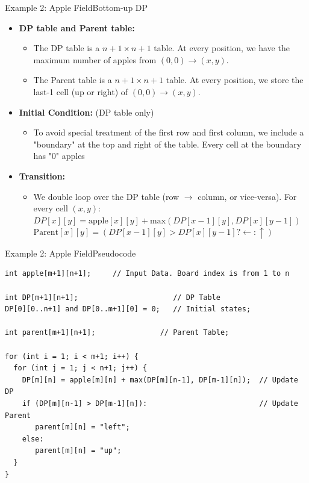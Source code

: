\begin{frame}{Example 2: Apple Field}{Bottom-up DP}
  \begin{itemize}
  \item {\bf DP table and Parent table:}
  \begin{itemize}
    \item The DP table is a $n+1\times n+1$ table. At every position, we have the maximum number of apples from $(0,0)\to(x,y)$.
    \item The Parent table is a $n+1\times n+1$ table. At every position, we store the last-1 cell (up or right) of $(0,0)\to(x,y)$.
  \end{itemize}

  \item {\bf Initial Condition:} (DP table only)
  \begin{itemize}
    \item To avoid special treatment of the first row and first column, we include a "boundary" at the top and right of the table. Every cell at the boundary has "0" apples
  \end{itemize}

  \item {\bf Transition:}
  \begin{itemize}
    \item We double loop over the DP table (row $\to$ column, or vice-versa). For every cell $(x,y)$:\\
    $DP[x][y] = \text{apple}[x][y] + \text{max}(DP[x-1][y],DP[x][y-1])$\\
    $\text{Parent}[x][y] = (DP[x-1][y] > DP[x][y-1]?\leftarrow:\uparrow)$
  \end{itemize}
  \end{itemize}
\end{frame}

\begin{frame}[fragile]{Example 2: Apple Field}{Pseudocode}
  {\smaller
  \begin{block}{}
\begin{verbatim}
int apple[m+1][n+1];     // Input Data. Board index is from 1 to n

int DP[m+1][n+1];                      // DP Table
DP[0][0..n+1] and DP[0..m+1][0] = 0;   // Initial states;

int parent[m+1][n+1];               // Parent Table;

for (int i = 1; i < m+1; i++) {
  for (int j = 1; j < n+1; j++) {
    DP[m][n] = apple[m][n] + max(DP[m][n-1], DP[m-1][n]);  // Update DP
    if (DP[m][n-1] > DP[m-1][n]):                          // Update Parent
       parent[m][n] = "left";
    else:
       parent[m][n] = "up";
  }
}
\end{verbatim}
\end{block}
  }
\end{frame}



